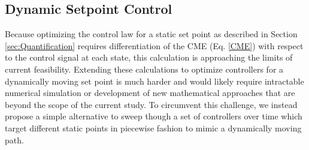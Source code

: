 \documentclass[12pt]{iopart}
\begin{document}

\subsection{Dynamic Setpoint Control}\label{sec:Dynamic}
Because optimizing the control law for a static set point as described in Section \ref{sec:Quantification} requires differentiation of the CME (Eq. \ref{CME}) with respect to the control signal at each state, this calculation is approaching the limits of current feasibility.
Extending these calculations to optimize controllers for a dynamically moving set point is much harder and would likely require intractable numerical simulation or development of new mathematical approaches that are beyond the scope of the current study. 
To circumvent this challenge, we instead propose a simple alternative to sweep though a set of controllers over time which target different static points in piecewise fashion to mimic a dynamically moving path.
\end{document}
